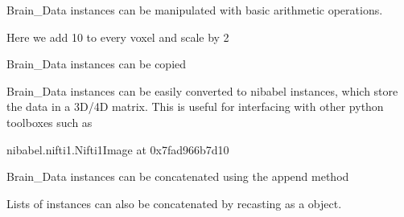 \documentclass[letterpaper,10pt,english]{sphinxmanual}
\begin{document}
\begin{sphinxVerbatim}[commandchars=\\\{\}]
  \PYG{p}{[}\PYG{p}{]}\PYG{p}{[}\PYG{p}{]}
\end{sphinxVerbatim}

Brain\_Data instances can be manipulated with basic arithmetic operations.

Here we add 10 to every voxel and scale by 2

\begin{sphinxVerbatim}[commandchars=\\\{\}]
      
\end{sphinxVerbatim}

Brain\_Data instances can be copied

\begin{sphinxVerbatim}[commandchars=\\\{\}]
  
\end{sphinxVerbatim}

Brain\_Data instances can be easily converted to nibabel instances, which store the data in a 3D/4D matrix.  This is useful for interfacing with other python toolboxes such as 

\begin{sphinxVerbatim}[commandchars=\\\{\}]
\end{sphinxVerbatim}

\begin{sphinxVerbatim}[commandchars=\\\{\}]
\PYGZlt{}nibabel.nifti1.Nifti1Image at 0x7fad966b7d10\PYGZgt{}
\end{sphinxVerbatim}

Brain\_Data instances can be concatenated using the append method

\begin{sphinxVerbatim}[commandchars=\\\{\}]
  \PYG{p}{[}\PYG{p}{]}
\end{sphinxVerbatim}

Lists of  instances can also be concatenated by recasting as a  object.
\end{document}
